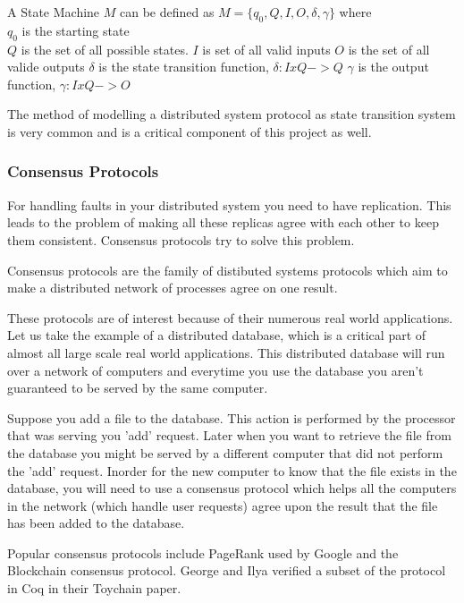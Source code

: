 A State Machine $M$ can be defined as $M = \lbrace q_0, Q, I, O, \delta, \gamma \rbrace$ where \\
$q_0$ is the starting state \\
$Q$ is the set of all possible states.
$I$ is set of all valid inputs
$O$ is the set of all valide outputs
$\delta$ is the state transition function, $\delta : I x Q -> Q$
$\gamma$ is the output function, $\gamma : I x Q -> O$


The method of modelling a distributed system protocol as state transition system
is very common and is a critical component of this project as well.


\subsubsection{Consensus Protocols}
For handling faults in your distributed system you need to have replication.
This leads to the problem of making all these replicas agree with each other
to keep them consistent. Consensus protocols try to solve this problem.

Consensus protocols are the family of distibuted systems protocols which aim to
make a distributed network of processes agree on one result.

These protocols are of interest because of their numerous real world applications.
Let us take the example of a distributed database, which is a critical part of almost
all large scale real world applications. This distributed database will run
over a network of computers and everytime you use the database you aren't guaranteed
to be served by the same computer.

Suppose you add a file to the database. This action is performed by the processor that
was serving you 'add' request. Later when you want to retrieve the file from the database
you might be served by a different computer that did not perform the 'add' request. Inorder
for the new computer to know that the file exists in the database, you will need to use a
consensus protocol which helps all the computers in the network (which handle user
requests) agree upon the result that the file has been added to the database.

Popular consensus protocols include PageRank used by Google and the Blockchain
consensus protocol. George and Ilya verified a subset of the protocol in Coq in
their Toychain paper.


